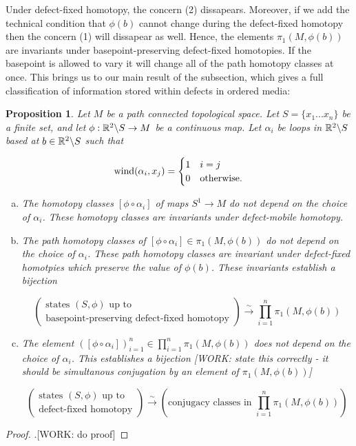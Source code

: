 \documentclass{article}
\newtheorem{proposition}{Proposition}[section]
\theoremstyle{definition}
\numberwithin{figure}{section}
\begin{document}
Under defect-fixed homotopy, the concern (2) dissapears. Moreover, if we add the technical condition that $\phi(b)$ cannot change during the defect-fixed homotopy then the concern (1) will dissapear as well. Hence, the elements $\pi_1(M,\phi(b))$ are invariants under basepoint-preserving defect-fixed homotopies. If the basepoint is allowed to vary it will change all of the path homotopy classes at once. This brings us to our main result of the subsection, which gives a full classification of information stored within defects in ordered media:

\begin{proposition} Let $M$ be a path connected topological space. Let $S=\{x_1...x_n\}$ be a finite set, and let $\phi:\mathbb{R}^2 \backslash S\to M$ be a continuous map. Let $\alpha_i$ be loops in $\mathbb{R}^2\backslash S$ based at $b\in \mathbb{R}^2\backslash S$ such that

$$\mathrm{wind}(\alpha_i,x_j)=
\begin{cases}
1 & i=j\\
0 & \text{otherwise}.
\end{cases}$$

\begin{enumerate}[(a)]
\item The homotopy classes $[\phi\circ \alpha_i]$ of maps $S^1\to M$ do not depend on the choice of $\alpha_i$. These homotopy classes are invariants under defect-mobile homotopy.
\item The path homotopy classes of $[\phi\circ \alpha_i]\in \pi_1(M,\phi(b))$ do not depend on the choice of $\alpha_i$. These path homotopy classes are invariant under defect-fixed homotpies which preserve the value of $\phi(b)$. These invariants establish a bijection

$$\left(\substack{\text{states $(S,\phi)$ up to} \\ \text{basepoint-preserving defect-fixed homotopy}}\right)\xrightarrow{\sim} \prod_{i=1}^n\pi_1(M,\phi(b))$$

\item The element $\left([\phi\circ\alpha_i]\right)_{i=1}^n \in \prod_{i=1}^n\pi_1(M,\phi(b))$ does not depend on the choice of $\alpha_i$. This establishes a bijection [WORK: state this correctly - it should be simultanous conjugation by an element of $\pi_1(M,\phi(b))$]

$$\left(\substack{\text{states $(S,\phi)$ up to} \\ \text{defect-fixed homotopy}}\right)\xrightarrow{\sim} \left(\text{conjugacy classes in }\prod_{i=1}^n\pi_1(M,\phi(b))\right)$$
\end{enumerate}
\end{proposition}
\begin{proof}.[WORK: do proof]
\end{proof}
\end{document}
